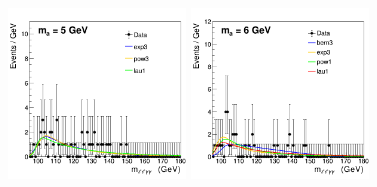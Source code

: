 \begin{figure}[htbp]
\begin{center}
		\includegraphics[width=0.42\textwidth]{figures/chapter04/bkg_fTest/allPdfs_cat0_5.png}
		\includegraphics[width=0.42\textwidth]{figures/chapter04/bkg_fTest/allPdfs_cat0_6.png}\\
    \label{fig:bkg_fTest1}
\end{center}
\end{figure}

